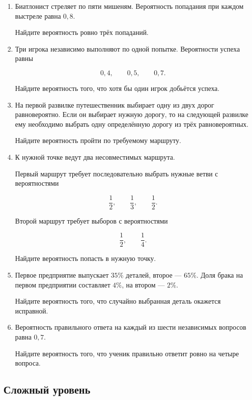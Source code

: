\documentclass[a4paper,12pt]{article}
\begin{document}
\begin{enumerate}[resume]

\item
Биатлонист стреляет по пяти мишеням. Вероятность попадания при каждом
выстреле равна $0,8$.

Найдите вероятность ровно трёх попаданий.

\item
Три игрока независимо выполняют по одной попытке. Вероятности успеха равны

\[
0,4,\qquad 0,5,\qquad 0,7.
\]

Найдите вероятность того, что хотя бы один игрок добьётся успеха.

\item
На первой развилке путешественник выбирает одну из двух дорог
равновероятно. Если он выбирает нужную дорогу, то на следующей развилке
ему необходимо выбрать одну определённую дорогу из трёх равновероятных.

Найдите вероятность пройти по требуемому маршруту.

\item
К нужной точке ведут два несовместимых маршрута.

Первый маршрут требует последовательно выбрать нужные ветви с
вероятностями

\[
\frac12,\qquad \frac13,\qquad \frac12.
\]

Второй маршрут требует выборов с вероятностями

\[
\frac12,\qquad \frac14.
\]

Найдите вероятность попасть в нужную точку.

\item
Первое предприятие выпускает $35\%$ деталей, второе --- $65\%$.
Доля брака на первом предприятии составляет $4\%$, на втором --- $2\%$.

Найдите вероятность того, что случайно выбранная деталь окажется
исправной.

\item
Вероятность правильного ответа на каждый из шести независимых вопросов
равна $0,7$.

Найдите вероятность того, что ученик правильно ответит ровно на четыре
вопроса.

\end{enumerate}

\subsection*{\color{darkaccent}Сложный уровень}
\end{document}
